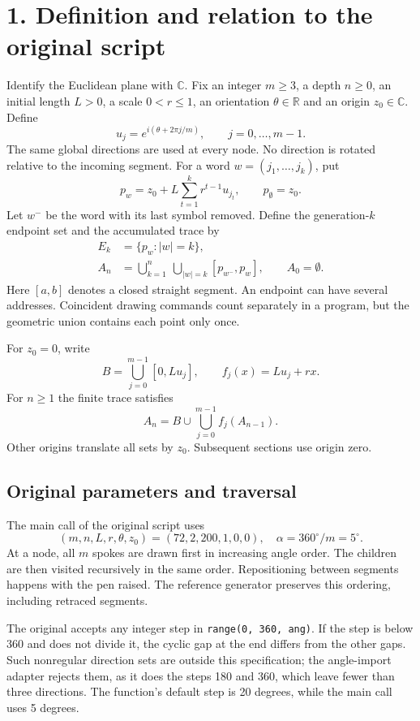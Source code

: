 \documentclass[11pt,a4paper]{article}
\newcommand{\C}{\mathbb C}
\newcommand{\R}{\mathbb R}
\newcommand{\sectiontitle}[1]{\section*{\sffamily\color{ink}#1}}
\begin{document}
\newpage
\sectiontitle{1. Definition and relation to the original script}
Identify the Euclidean plane with $\C$. Fix an integer $m\ge3$, a depth
$n\ge0$, an initial length $L>0$, a scale $0<r\le1$, an orientation
$\theta\in\R$ and an origin $z_0\in\C$. Define
\[
u_j=e^{i(\theta+2\pi j/m)},\qquad j=0,\ldots,m-1.
\]
The same global directions are used at every node. No direction is rotated
relative to the incoming segment. For a word $w=(j_1,\ldots,j_k)$, put
\begin{equation}
p_w=z_0+L\sum_{t=1}^k r^{t-1}u_{j_t},\qquad p_\emptyset=z_0.
\end{equation}
Let $w^-$ be the word with its last symbol removed. Define the generation-$k$
endpoint set and the accumulated trace by
\begin{align}
E_k&=\{p_w:|w|=k\},\\
A_n&=\bigcup_{k=1}^n\ \bigcup_{|w|=k}[p_{w^-},p_w],\qquad A_0=\emptyset.
\end{align}
Here $[a,b]$ denotes a closed straight segment. An endpoint can have several
addresses. Coincident drawing commands count separately in a program, but
the geometric union contains each point only once.

For $z_0=0$, write
\[
B=\bigcup_{j=0}^{m-1}[0,Lu_j],\qquad f_j(x)=Lu_j+rx.
\]
For $n\ge1$ the finite trace satisfies
\begin{equation}
A_n=B\cup\bigcup_{j=0}^{m-1} f_j(A_{n-1}).
\end{equation}
Other origins translate all sets by $z_0$. Subsequent sections use origin zero.

\subsection*{Original parameters and traversal}
The main call of the original script uses
\[
(m,n,L,r,\theta,z_0)=(72,2,200,1,0,0),\quad \alpha=360^\circ/m=5^\circ.
\]
At a node, all $m$ spokes are drawn first in increasing angle order.
The children are then visited recursively in the same order. Repositioning
between segments happens with the pen raised. The reference generator
preserves this ordering, including retraced segments.

The original accepts any integer step in \texttt{range(0, 360, ang)}. If the
step is below 360 and does not divide it, the cyclic gap at the end differs
from the other gaps. Such nonregular direction sets are outside this
specification; the angle-import adapter rejects them, as it does the steps
180 and 360, which leave fewer than three directions. The function's default
step is 20 degrees, while the main call uses 5 degrees.
\end{document}
